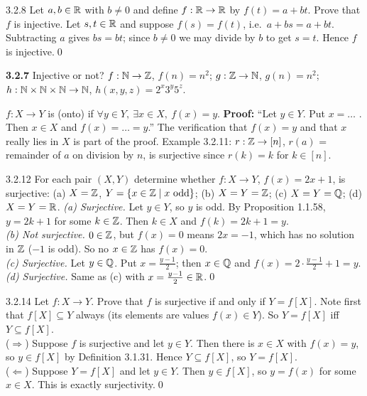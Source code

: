 \begin{bookex}[essential]{3.2.8}
Let $a,b\in\mathbb{R}$ with $b\ne0$ and define $f:\mathbb{R}\to\mathbb{R}$ by $f(t)=a+bt$. Prove that $f$ is injective.
\solution
Let $s,t\in\mathbb{R}$ and suppose $f(s)=f(t)$, i.e.\ $a+bs=a+bt$. Subtracting $a$ gives $bs=bt$; since $b\ne0$ we may divide by $b$ to get $s=t$. Hence $f$ is injective.\qed
\end{bookex}

\begin{trybox}[{3.2.7 \fO}]
\textbf{3.2.7} Injective or not? $f:\mathbb{N}\to\mathbb{Z}$, $f(n)=n^2$; $g:\mathbb{Z}\to\mathbb{N}$, $g(n)=n^2$; $h:\mathbb{N}\times\mathbb{N}\times\mathbb{N}\to\mathbb{N}$, $h(x,y,z)=2^x3^y5^z$.
\end{trybox}

\begin{key}
$f:X\to Y$ is  (onto) if $\forall y\in Y,\ \exists x\in X,\ f(x)=y$. \textbf{Proof:} ``Let $y\in Y$. Put $x=\dots$ . Then $x\in X$  and $f(x)=\dots=y$.'' The verification that $f(x)=y$ and that $x$ really lies in $X$ is part of the proof. Example 3.2.11: $r:\mathbb{Z}\to[n]$, $r(a)$ = remainder of $a$ on division by $n$, is surjective since $r(k)=k$ for $k\in[n]$.
\end{key}

\begin{bookex}[essential]{3.2.12}
For each pair $(X,Y)$ determine whether $f:X\to Y$, $f(x)=2x+1$, is surjective: (a) $X=\mathbb{Z}$, $Y=\{x\in\mathbb{Z}\mid x\text{ odd}\}$; (b) $X=Y=\mathbb{Z}$; (c) $X=Y=\mathbb{Q}$; (d) $X=Y=\mathbb{R}$.
\solution
\emph{(a) Surjective.} Let $y\in Y$, so $y$ is odd. By Proposition 1.1.58, $y=2k+1$ for some $k\in\mathbb{Z}$. Then $k\in X$ and $f(k)=2k+1=y$.\\
\emph{(b) Not surjective.} $0\in\mathbb{Z}$, but $f(x)=0$ means $2x=-1$, which has no solution in $\mathbb{Z}$ ($-1$ is odd). So no $x\in\mathbb{Z}$ has $f(x)=0$.\\
\emph{(c) Surjective.} Let $y\in\mathbb{Q}$. Put $x=\frac{y-1}2$; then $x\in\mathbb{Q}$ and $f(x)=2\cdot\frac{y-1}2+1=y$.\\
\emph{(d) Surjective.} Same as (c) with $x=\frac{y-1}2\in\mathbb{R}$.\qed
\end{bookex}

\begin{bookex}[essential]{3.2.14}
Let $f:X\to Y$. Prove that $f$ is surjective if and only if $Y=f[X]$.
\solution
Note first that $f[X]\subseteq Y$ always (its elements are values $f(x)\in Y$). So $Y=f[X]$ iff $Y\subseteq f[X]$.\\
($\Rightarrow$) Suppose $f$ is surjective and let $y\in Y$. Then there is $x\in X$ with $f(x)=y$, so $y\in f[X]$ by Definition 3.1.31. Hence $Y\subseteq f[X]$, so $Y=f[X]$.\\
($\Leftarrow$) Suppose $Y=f[X]$ and let $y\in Y$. Then $y\in f[X]$, so $y=f(x)$ for some $x\in X$. This is exactly surjectivity.\qed
\end{bookex}


